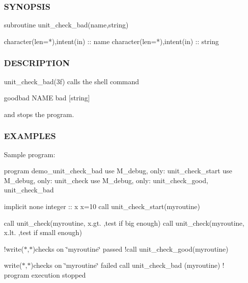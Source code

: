 \subsubsection*{S\+Y\+N\+O\+P\+S\+IS}

\begin{DoxyVerb}subroutine unit_check_bad(name,string)

 character(len=*),intent(in) :: name
 character(len=*),intent(in) :: string
\end{DoxyVerb}


\subsubsection*{D\+E\+S\+C\+R\+I\+P\+T\+I\+ON}

\begin{DoxyVerb}unit_check_bad(3f) calls the shell command

     goodbad NAME bad [string]

and stops the program.
\end{DoxyVerb}


\subsubsection*{E\+X\+A\+M\+P\+L\+ES}

Sample program\+:

program demo\+\_\+unit\+\_\+check\+\_\+bad use M\+\_\+debug, only\+: unit\+\_\+check\+\_\+start use M\+\_\+debug, only\+: unit\+\_\+check use M\+\_\+debug, only\+: unit\+\_\+check\+\_\+good, unit\+\_\+check\+\_\+bad

implicit none integer \+:\+: x x=10 call unit\+\_\+check\+\_\+start(\textquotesingle{}myroutine\textquotesingle{})

call unit\+\_\+check(\textquotesingle{}myroutine\textquotesingle{}, x.\+gt. ,\textquotesingle{}test if big enough\textquotesingle{}) call unit\+\_\+check(\textquotesingle{}myroutine\textquotesingle{}, x.\+lt. ,\textquotesingle{}test if small enough\textquotesingle{})

!write($\ast$,$\ast$)\textquotesingle{}checks on \char`\"{}myroutine\char`\"{} passed\textquotesingle{} !call unit\+\_\+check\+\_\+good(\textquotesingle{}myroutine\textquotesingle{})

write($\ast$,$\ast$)\textquotesingle{}checks on \char`\"{}myroutine\char`\"{} failed\textquotesingle{} call unit\+\_\+check\+\_\+bad (\textquotesingle{}myroutine\textquotesingle{}) ! program execution stopped

